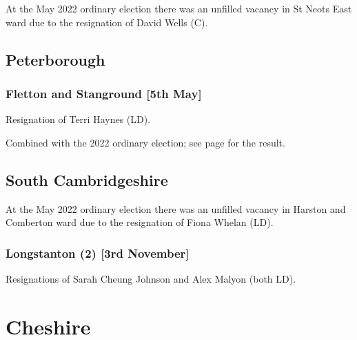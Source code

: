 \documentclass[a4paper,openany]{book}
\begin{document}
\begin{resultsiii}
At the May 2022 ordinary election there was an unfilled vacancy in St Neots East ward due to the resignation of David Wells (C).%

\subsection*{Peterborough}

\subsubsection*{Fletton and Stanground \hspace*{\fill}\nolinebreak[1]%
	\enspace\hspace*{\fill}
	[5th May]}


Resignation of Terri Haynes (LD).

Combined with the 2022 ordinary election; see page \pageref{PeterboroughFlettonStanground} for the result.

\subsection*{South Cambridgeshire}

At the May 2022 ordinary election there was an unfilled vacancy in Harston and Comberton ward due to the resignation of Fiona Whelan (LD).%

\subsubsection*{Longstanton (2) \hspace*{\fill}\nolinebreak[1]%
	\enspace\hspace*{\fill}
	[3rd November]}


Resignations of Sarah Cheung Johnson and Alex Malyon (both LD).

\section{Cheshire}


\end{resultsiii}
\end{document}

